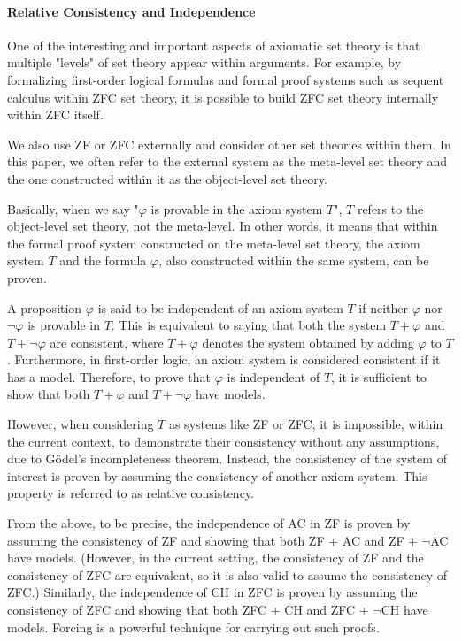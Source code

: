 \documentclass{report}
\begin{document}
\paragraph{Relative Consistency and Independence}

One of the interesting and important aspects of axiomatic set theory is that 
multiple "levels" of set theory appear within arguments.
For example, by formalizing first-order logical formulas and formal proof systems such as sequent calculus within ZFC set theory, 
it is possible to build ZFC set theory internally within ZFC itself.

We also use ZF or ZFC externally and consider other set theories within them. 
In this paper, we often refer to the external system as the meta-level set theory 
and the one constructed within it as the object-level set theory.

Basically, when we say "$\varphi$ is provable in the axiom system $T$", $T$ refers to the object-level set theory, not the meta-level. 
In other words, it means that within the formal proof system constructed on the meta-level set theory, the axiom system 
$T$ and the formula $\varphi$, also constructed within the same system, can be proven.

A proposition $\varphi$ is said to be independent of an axiom system $T$ if neither $\varphi$ nor $\neg \varphi$ is provable in $T$.
This is equivalent to saying that both the system $T+\varphi$ and $T+\neg \varphi$ are consistent,
where $T+\varphi$ denotes the system obtained by adding $\varphi$ to $T$.
Furthermore, in first-order logic, an axiom system is considered consistent if it has a model.
Therefore, to prove that $\varphi$ is independent of $T$, it is sufficient to show that both $T+\varphi$ and $T+\neg \varphi$ have models.

However, when considering $T$ as systems like ZF or ZFC, it is impossible, within the current context, 
to demonstrate their consistency without any assumptions, due to Gödel's incompleteness theorem. 
Instead, the consistency of the system of interest is proven by assuming the consistency of another axiom system. 
This property is referred to as relative consistency.

From the above, to be precise, the independence of AC in ZF is proven by assuming the consistency of ZF 
and showing that both ZF + AC and ZF + $\neg$AC have models. 
(However, in the current setting, the consistency of ZF and the consistency of ZFC are equivalent, so it is also valid to assume the consistency of ZFC.)
Similarly, the independence of CH in ZFC is proven by assuming the consistency of ZFC 
and showing that both ZFC + CH and ZFC + $\neg$CH have models.
Forcing is a powerful technique for carrying out such proofs.
\end{document}
